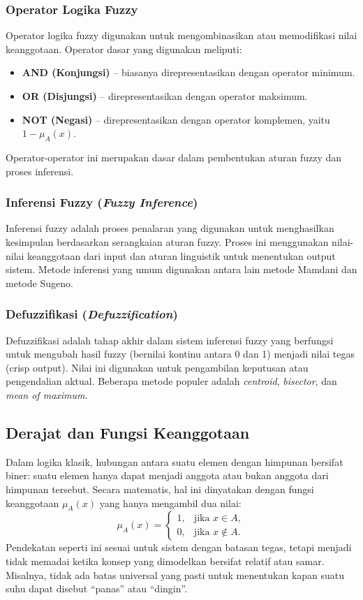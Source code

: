 \documentclass[12pt,a4paper]{article}
\theoremstyle{remark}
\begin{document}
\subsubsection{Operator Logika Fuzzy}
Operator logika fuzzy digunakan untuk mengombinasikan atau memodifikasi nilai keanggotaan. Operator dasar yang digunakan meliputi:
\begin{itemize}
    \item \textbf{AND (Konjungsi)} – biasanya direpresentasikan dengan operator minimum.
    \item \textbf{OR (Disjungsi)} – direpresentasikan dengan operator maksimum.
    \item \textbf{NOT (Negasi)} – direpresentasikan dengan operator komplemen, yaitu \(1 - \mu_A(x)\).
\end{itemize}
Operator-operator ini merupakan dasar dalam pembentukan aturan fuzzy dan proses inferensi.

\subsubsection{Inferensi Fuzzy (\textit{Fuzzy Inference})}
Inferensi fuzzy adalah proses penalaran yang digunakan untuk menghasilkan kesimpulan berdasarkan serangkaian aturan fuzzy. Proses ini menggunakan nilai-nilai keanggotaan dari input dan aturan linguistik untuk menentukan output sistem.
Metode inferensi yang umum digunakan antara lain metode Mamdani dan metode Sugeno.

\subsubsection{Defuzzifikasi (\textit{Defuzzification})}
Defuzzifikasi adalah tahap akhir dalam sistem inferensi fuzzy yang berfungsi untuk mengubah hasil fuzzy (bernilai kontinu antara 0 dan 1) menjadi nilai tegas (crisp output). Nilai ini digunakan untuk pengambilan keputusan atau pengendalian aktual. Beberapa metode populer adalah \textit{centroid}, \textit{bisector}, dan \textit{mean of maximum}.

\subsection{Derajat dan Fungsi Keanggotaan}

Dalam logika klasik, hubungan antara suatu elemen dengan himpunan bersifat biner: suatu elemen hanya dapat menjadi anggota atau bukan anggota dari himpunan tersebut. Secara matematis, hal ini dinyatakan dengan fungsi keanggotaan \(\mu_A(x)\) yang hanya mengambil dua nilai:
\[
    \mu_A(x) =
    \begin{cases}
        1, & \text{jika } x \in A,    \\
        0, & \text{jika } x \notin A.
    \end{cases}
\]
Pendekatan seperti ini sesuai untuk sistem dengan batasan tegas, tetapi menjadi tidak memadai ketika konsep yang dimodelkan bersifat relatif atau samar. Misalnya, tidak ada batas universal yang pasti untuk menentukan kapan suatu suhu dapat disebut “panas” atau “dingin”.
\end{document}
